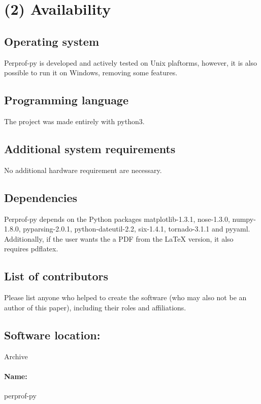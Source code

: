 \documentclass[10pt,a4paper]{article}
\begin{document}
\section*{(2) Availability}

\subsection*{Operating system}

    Perprof-py is developed and actively tested on Unix plaftorms, however, it
    is also possible to run it on Windows, removing some features.

\subsection*{Programming language}

    The project was made entirely with python3.

\subsection*{Additional system requirements}

    No additional hardware requirement are necessary.

\subsection*{Dependencies}

    Perprof-py depends on the Python packages matplotlib-1.3.1, nose-1.3.0,
    numpy-1.8.0, pyparsing-2.0.1, python-dateutil-2.2, six-1.4.1, tornado-3.1.1
    and pyyaml. Additionally, if the user wants the a PDF from the LaTeX
    version, it also requires pdflatex.

\subsection*{List of contributors}

    Please list anyone who helped to create the software (who may also not be an
    author of this paper), including their roles and affiliations.

\subsection*{Software location:}

    Archive

    \paragraph{Name:} perprof-py
\end{document}
